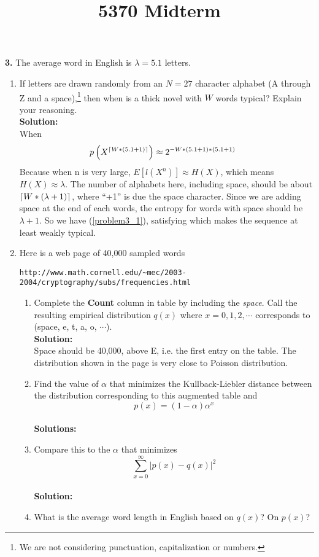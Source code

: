 \documentclass{assignment}
\title{5370 Midterm}
\begin{document}
\textbf{3.}
\label{SquishyBear}
The average word in English is $\lambda =5.1$ letters.
\begin{enumerate}
\item  If letters are drawn randomly from an $N=27$ character alphabet (A through Z and a space),\footnote{
    We are not considering punctuation, capitalization or numbers.
  }
  then when is a thick novel with $W$ words typical? Explain your reasoning. \\

  \textbf{Solution:} \\
  When
  \begin{align}
    p\left(X^{\left \lceil W*(5.1 + 1) \right \rceil}\right) & \approx 2^{-W*(5.1 + 1)*(5.1 + 1)} \label{problem3_1}
  \end{align}
  Because when n is very large, $E[l(X^n)] \approx H(X)$, which means $H(X) \approx \lambda$. The number of alphabets
  here, including space, should be about $\left \lceil W * (\lambda + 1) \right \rceil$, where ``+1'' is due the space character. Since
  we are adding space at the end of each words, the entropy for words with space should be $\lambda + 1$. So we have
  (\ref{problem3_1}), satisfying which makes the sequence at least weakly typical.

\item Here is a web page of 40,000 sampled words
  \begin{center}
    \verb"http://www.math.cornell.edu/~mec/2003-2004/cryptography/subs/frequencies.html"
  \end{center}
  \begin{enumerate}
  \item Complete the {\bf Count} column in table by including the {\em space}. Call the resulting empirical
    distribution $q(x)$ where $x=0,1,2,\cdots$ corresponds to (space, e, t, a, o, $\cdots$). \\
    \textbf{Solution:} \\
    Space should be 40,000, above E, i.e. the first entry on the table.
    The distribution shown in the page is very close to Poisson distribution.

  \item Find the value of $\alpha$ that minimizes the Kullback-Liebler distance between the distribution corresponding to this augmented table and
    $$p(x) = (1-\alpha) \alpha^x $$ \\
    \textbf{Solutions:}\\

  \item Compare this to the $\alpha$ that minimizes
    $$ \sum_{x=0}^\infty \left| p(x) -  q(x) \right|^2 $$ \\
    \textbf{Solution:} \\


  \item What is the average word length in English based on $q(x)$? On $p(x)$?
  \end{enumerate}
\end{enumerate}
\end{document}
